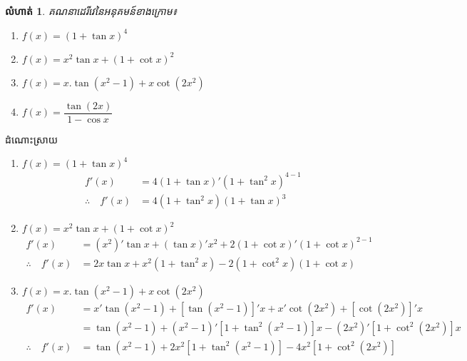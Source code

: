 \documentclass[12pt,fleqn]{book} %
\newtheorem{exercise}{\kml លំហាត់}
\newcommand{\answer}{\begin{center}
\kml \color{magenta} ដំណោះស្រាយ
\end{center}}
\begin{document}
\begin{exercise}
គណនាដេរីវេនៃអនុគមន៍ខាងក្រោម៖
\begin{multicols}{2}
\begin{enumerate}
\item $f(x)=(1+\tan x)^4$
\item $f(x)=x^2 \tan x+(1+\cot x)^2$
\item $f(x)=x.\tan (x^2-1)+x\cot (2x^2)$
\item $f(x)=\dfrac{\tan (2x)}{1-\cos x}$
\end{enumerate}
\end{multicols}
\end{exercise}

\answer 
\begin{enumerate}
\item $f(x)=(1+\tan x)^4$
\begin{align*}
f'(x)&=4(1+\tan x)'(1+\tan^2 x)^{4-1}\\
\therefore \quad f'(x)&=4(1+\tan^2 x)(1+\tan x)^3
\end{align*}
\item $f(x)=x^2 \tan x+(1+\cot x)^2$
\begin{align*}
f'(x)&=(x^2)'\tan x+(\tan x)' x^2 +2(1+\cot x)'(1+\cot x)^{2-1}\\
\therefore \quad f'(x)&= 2x\tan x+x^2(1+\tan^2 x)-2(1+\cot^2 x)(1+\cot x)
\end{align*}

\item $f(x)=x.\tan (x^2-1)+x\cot (2x^2)$
\begin{align*}
f'(x)&=x'\tan (x^2-1)+[\tan (x^2-1)]'x+x'\cot (2x^2)+[\cot (2x^2)]'x\\
&=\tan (x^2-1)+(x^2-1)'[1+\tan^2 (x^2-1)]x-(2x^2)'[1+\cot^2 (2x^2)]x\\
\therefore \quad f'(x)&=\tan (x^2-1)+2x^2 [1+\tan^2 (x^2-1)]-4x^2[1+\cot^2 (2x^2)]
\end{align*}
\end{enumerate}
\end{document}
